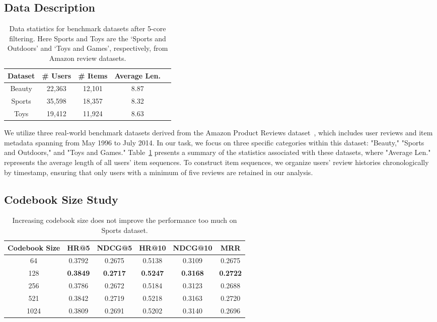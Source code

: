 \subsection{Data Description}\label{appendix:data}
\begin{table}[htb!]
\centering
\caption{Data statistics for benchmark datasets after 5-core filtering. Here Sports and Toys are the `Sports and Outdoors' and `Toys and Games', respectively, from Amazon review datasets.}
\label{tab:data}
\begin{tabular}{ccccc}
\toprule
Dataset & \# Users &  \# Items & {Average Len.}\\
\midrule
Beauty & 22,363 & 12,101 & 8.87 \\
Sports & 35,598 & 18,357 & 8.32\\
Toys & 19,412 & 11,924 & 8.63 \\
\bottomrule
\end{tabular}
\end{table}
We utilize three real-world benchmark datasets derived from the Amazon Product Reviews dataset~\citep{he2016ups}, which includes user reviews and item metadata spanning from May 1996 to July 2014. In our task, we focus on three specific categories within this dataset: "Beauty," "Sports and Outdoors," and "Toys and Games." Table~\ref{tab:data} presents a summary of the statistics associated with these datasets, where "Average Len." represents the average length of all users' item sequences. To construct item sequences, we organize users' review histories chronologically by timestamp, ensuring that only users with a minimum of five reviews are retained in our analysis.


\subsection{Codebook Size Study}\label{appendix:codebooksize}

\begin{table*}[!htb]
\centering
\caption{Increasing codebook size does not improve the performance too much on Sports dataset.}
\label{tab:codebook_size}
\begin{tabular}{cccccc}
\hline
Codebook   Size & HR@5            & NDCG@5          & HR@10           & NDCG@10         & MRR             \\ \hline
64              & 0.3792          & 0.2675          & 0.5138          & 0.3109          & 0.2675          \\ \hline
128             & \textbf{0.3849} & \textbf{0.2717} & \textbf{0.5247} & \textbf{0.3168} & \textbf{0.2722} \\ \hline
256             & 0.3786          & 0.2672          & 0.5184          & 0.3123          & 0.2688          \\ \hline
521             & 0.3842          & 0.2719          & 0.5218          & 0.3163          & 0.2720          \\ \hline
1024            & 0.3809          & 0.2691          & 0.5202          & 0.3140          & 0.2696          \\ \hline
\end{tabular}
\end{table*}

